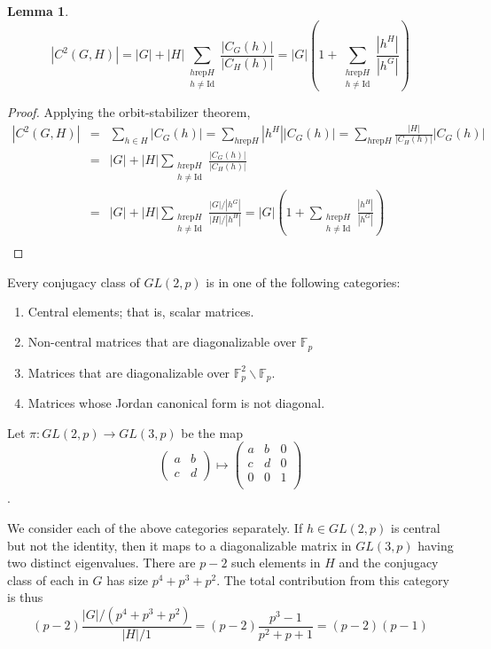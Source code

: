 \documentclass[12pt,letterpaper]{article}
\newtheorem{lem}{Lemma}
\newcommand{\rep}{\mathrm{rep}}
\newcommand{\Id}{\mathrm{Id}}
\begin{document}
\begin{lem}\label{ConjLemma}
$$|C^2(G,H)| = |G| + |H| \sum_{\substack{h \rep H\\ h\neq
    \Id}}\frac{|C_G(h)|}{|C_H(h)|} = |G| \left( 1 + \sum_{\substack{h \rep H\\ h\neq
    \Id}}\frac{|h^H|}{|h^G|}\right) $$
\end{lem}
\begin{proof}
Applying the orbit-stabilizer theorem,
\begin{eqnarray*}
  |C^2(G,H)| & = & \sum_{h\in H}|C_G(h)| = \sum_{h\rep H}|h^H||C_G(h)| =
  \sum_{h\rep H}\frac{|H|}{|C_H(h)|}|C_G(h)|\\
  & = & |G| + |H|\sum_{\substack{h \rep H\\ h\neq
      \Id}}\frac{|C_G(h)|}{|C_H(h)|}\\
  & = & |G| + |H|\sum_{\substack{h \rep H\\ h\neq
      \Id}}\frac{|G|/|h^G|}{|H|/|h^H|} = |G| \left( 1 + \sum_{\substack{h \rep H\\ h\neq
        \Id}}\frac{|h^H|}{|h^G|}\right)\\
\end{eqnarray*}
\end{proof}

Every conjugacy class of $GL(2,p)$ is in one of the following
categories:
\begin{enumerate}
\item Central elements; that is, scalar matrices.
\item Non-central matrices that are diagonalizable over $\mathbb{F}_p$
\item Matrices that are diagonalizable over
  $\mathbb{F}_p^2\backslash\mathbb{F}_p$.
\item Matrices whose Jordan canonical form is not diagonal.
\end{enumerate}

Let $\pi:GL(2,p)\to GL(3,p)$ be the map $$\left(\begin{array}{cc} a & b\\ c & d\end{array}\right)
\mapsto \left(\begin{array}{ccc} a & b & 0\\ c& d& 0\\ 0 & 0 &
    1\\\end{array}\right)$$. 

We consider each of the above categories separately. If $h\in GL(2,p)$
is central but not the identity, then it maps to a diagonalizable
matrix in $GL(3,p)$ having two distinct eigenvalues. There are $p-2$
such elements in $H$ and the conjugacy class of each in $G$ has size
$p^4+p^3+p^2$. The total contribution from this category is
thus $$(p-2)\frac{|G|/(p^4+p^3+p^2)}{|H|/1} = (p-2)\frac{p^3-1}{p^2+p+1} = (p-2)(p-1)$$
\end{document}
